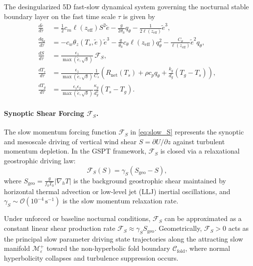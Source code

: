 \documentclass[11pt]{article}
\begin{document}
The desingularized 5D fast-slow dynamical system governing the nocturnal stable boundary layer on the fast time scale $\tau$ is given by
\begin{align}
\frac{d\tilde{e}}{d\tau} &= \frac{1}{2} c_m \ell(z_{\text{eff}}) S^2 \tilde{e} - \frac{g}{2\theta_0} q_\theta - \frac{1}{2\ell(z_{\text{eff}})} \tilde{e}^3, \label{eq:fast_e}\\
\frac{dq_\theta}{d\tau} &= -c_w \theta_z(T_s,\tilde{e})\tilde{e}^3 - \frac{g}{\theta_0}c_\theta \ell(z_{\text{eff}}) q_\theta^2 - \frac{C_\theta}{\ell(z_{\text{eff}})}\tilde{e}^2 q_\theta, \label{eq:fast_q}\\
\frac{dS}{d\tau} &= \frac{\epsilon_1}{\max\left(\tilde{e},\sqrt{\delta}\right)}\,\mathcal{F}_S, \label{eq:slow_S}\\
\frac{dT_s}{d\tau} &= \frac{\epsilon_1}{\max\left(\tilde{e},\sqrt{\delta}\right)}\frac{1}{C_s}\left(R_{\text{net}}(T_s) + \rho c_p q_\theta + \frac{k_g}{d_g}(T_g-T_s)\right), \label{eq:slow_Ts}\\
\frac{dT_g}{d\tau} &= \frac{\epsilon_1\epsilon_2}{\max\left(\tilde{e},\sqrt{\delta}\right)}\frac{\kappa_g}{d_g^2}(T_s-T_g). \label{eq:superslow_Tg}
\end{align}

\paragraph{Synoptic Shear Forcing $\mathcal{F}_S$.}
The slow momentum forcing function $\mathcal{F}_S$ in \eqref{eq:slow_S} represents the synoptic and mesoscale driving of vertical wind shear $S = \partial U / \partial z$ against turbulent momentum depletion. In the GSPT framework, $\mathcal{F}_S$ is closed via a relaxational geostrophic driving law:
\begin{equation}
\mathcal{F}_S(S) = \gamma_S \left( S_{\text{geo}} - S \right),
\label{eq:shear_forcing_closure}
\end{equation}
where $S_{\text{geo}} = \frac{g}{f_0 T_0} \left| \nabla_h T \right|$ is the background geostrophic shear maintained by horizontal thermal advection or low-level jet (LLJ) inertial oscillations, and $\gamma_S \sim \mathcal{O}(10^{-4}\,\mathrm{s}^{-1})$ is the slow momentum relaxation rate.

Under unforced or baseline nocturnal conditions, $\mathcal{F}_S$ can be approximated as a constant linear shear production rate $\mathcal{F}_S \approx \gamma_S S_{\text{geo}}$. Geometrically, $\mathcal{F}_S > 0$ acts as the principal slow parameter driving state trajectories along the attracting slow manifold $\mathcal{M}_\varepsilon^+$ toward the non-hyperbolic fold boundary $\mathcal{C}_{\text{fold}}$, where normal hyperbolicity collapses and turbulence suppression occurs.
\end{document}
